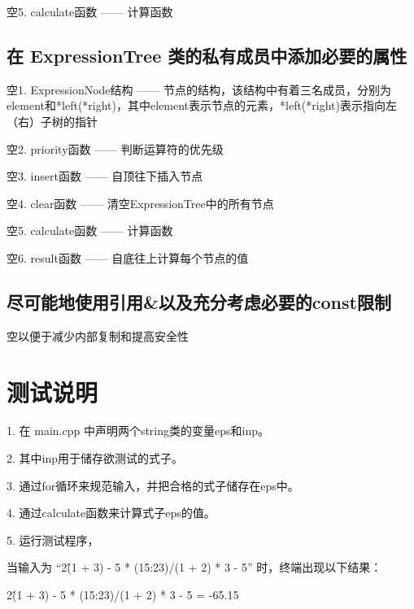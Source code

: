 \documentclass[UTF8]{ctexart}
\begin{document}
\hphantom 空5. calculate函数 —— 计算函数

\subsection{在 ExpressionTree 类的私有成员中添加必要的属性}

\hphantom 空1. ExpressionNode结构 —— 节点的结构，该结构中有着三名成员，分别为element和*left(*right)，其中element表示节点的元素，*left(*right)表示指向左（右）子树的指针\newline

\hphantom 空2. priority函数 —— 判断运算符的优先级\newline

\hphantom 空3. insert函数 —— 自顶往下插入节点\newline

\hphantom 空4. clear函数 —— 清空ExpressionTree中的所有节点\newline

\hphantom 空5. calculate函数 —— 计算函数\newline

\hphantom 空6. result函数 —— 自底往上计算每个节点的值

\subsection{尽可能地使用引用\&以及充分考虑必要的const限制}
\hphantom 空以便于减少内部复制和提高安全性

\section{测试说明}

1. 在 main.cpp 中声明两个string类的变量eps和inp。\newline

2. 其中inp用于储存欲测试的式子。 \newline

3. 通过for循环来规范输入，并把合格的式子储存在eps中。\newline

4. 通过calculate函数来计算式子eps的值。\newline

5. 运行测试程序，\newline

当输入为 “2\^(1 + 3) - 5 *  (15:23)/(1 + 2) * 3 - 5” 时，终端出现以下结果：\newline

2\^(1 + 3) - 5 *  (15:23)/(1 + 2) * 3 - 5 = -65.15\newline
\end{document}
